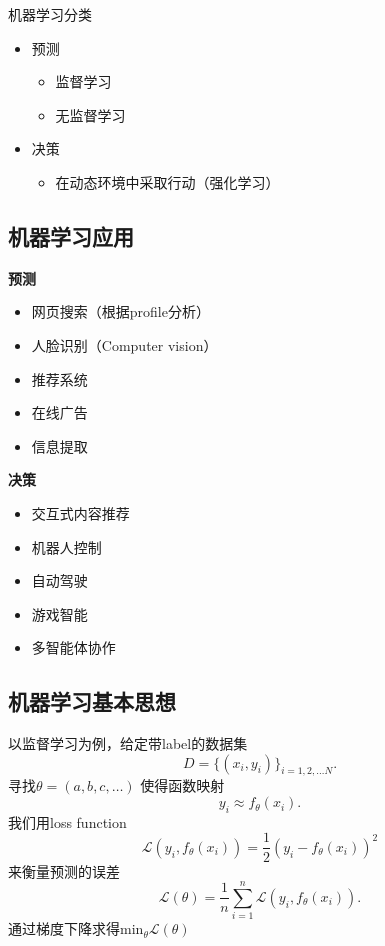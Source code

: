 \noindent 机器学习分类
\begin{itemize}
		\item 预测
				\begin{itemize}
						\item 监督学习
						\item 无监督学习
				\end{itemize}
		\item 决策
				\begin{itemize}
						\item 在动态环境中采取行动（强化学习）
				\end{itemize}
\end{itemize}

\subsection{机器学习应用}
\noindent \textbf{预测}
\begin{itemize}
		\item 网页搜索（根据profile分析）
		\item 人脸识别（Computer vision）
		\item 推荐系统
		\item 在线广告
		\item 信息提取
\end{itemize}
\noindent \textbf{决策}
\begin{itemize}
		\item 交互式内容推荐
		\item 机器人控制
		\item 自动驾驶
		\item 游戏智能		
		\item 多智能体协作
\end{itemize}

\subsection{机器学习基本思想}
	以监督学习为例，给定带label的数据集
	 \[
			 D = \{\left( x_{i},y_{i} \right) \}_{i=1,2,\ldots N} 
	.\] 
	寻找$\theta=\left( a,b,c,\ldots \right) $ 使得函数映射
	\[
			y_{i} \approx f_{\theta} \left( x_{i} \right) 
	.\] 
	我们用loss function 
	\[ 
			\mathcal{L}\left( y_{i},f_{\theta}\left( x_{i} \right)  \right) =\frac{1}{2}\left( y_{i}-f_{\theta}\left( x_{i} \right)  \right)^2  
	\]
	来衡量预测的误差
	\[
			\mathcal{L}\left( \theta \right)  = 
			\frac{1}{n} \sum_{i=1}^{n} \mathcal{L}\left( y_{i},f_{\theta}\left( x_{i} \right)  \right) 
	.\] 
	通过梯度下降求得$ \mathrm{min}_{\theta}  \mathcal{L}\left( \theta \right) $

